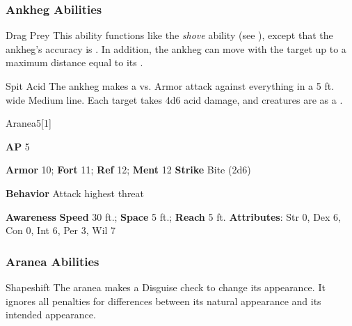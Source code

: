 \subsubsection{Ankheg Abilities}

\begin{ability}{Drag Prey}
This ability functions like the \textit{shove} ability (see ), except that the ankheg's accuracy is .
In addition, the ankheg can move with the target up to a maximum distance equal to its .
\end{ability}

\vspace{0.5em}
\begin{ability}{Spit Acid}
The ankheg makes a  vs. Armor attack against everything in a 5 ft. wide Medium line.
\hit Each target takes 4d6 acid damage, and creatures are  as a .
\end{ability}

\begin{monsection}{Aranea}{5}[1]
\vspace{-1em}\vspace{-1em}
\begin{spellcontent}
\begin{spelltargetinginfo}
{\textbf{AP} 5}

\pari \textbf{Armor} 10;
\textbf{Fort} 11;
\textbf{Ref} 12;
\textbf{Ment} 12
\pari \textbf{Strike} Bite  (2d6)



\pari \textbf{Behavior} Attack highest threat
\end{spelltargetinginfo}
\end{spellcontent}

\begin{monsterfooter}
\pari \textbf{Awareness} 
\pari \textbf{Speed} 30 ft.;
\textbf{Space} 5 ft.;
\textbf{Reach} 5 ft.
\pari \textbf{Attributes}:
Str 0,
Dex 6,
Con 0,
Int 6,
Per 3,
Wil 7
\end{monsterfooter}
\end{monsection}


\subsubsection{Aranea Abilities}

\begin{ability}{Shapeshift}
The aranea makes a Disguise check to change its appearance.
It ignores all penalties for differences between its natural appearance and its intended appearance.
\end{ability}

